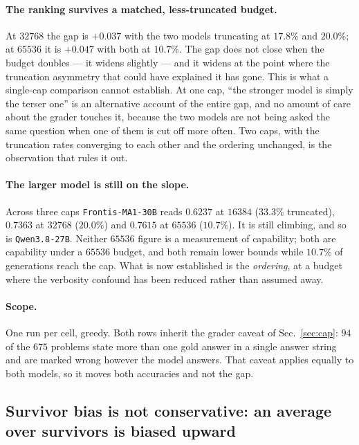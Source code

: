 \paragraph{The ranking survives a matched, less-truncated budget.} At $32768$ the gap is
$+0.037$ with the two models truncating at $17.8\%$ and $20.0\%$; at $65536$ it is $+0.047$
with both at $10.7\%$. The gap does not close when the budget doubles --- it widens slightly
--- and it widens at the point where the truncation asymmetry that could have explained it
has gone. This is what a single-cap comparison cannot establish. At one cap, ``the stronger
model is simply the terser one'' is an alternative account of the entire gap, and no amount
of care about the grader touches it, because the two models are not being asked the same
question when one of them is cut off more often. Two caps, with the truncation rates
converging to each other and the ordering unchanged, is the observation that rules it out.

\paragraph{The larger model is still on the slope.} Across three caps
\texttt{Frontis-MA1-30B} reads $0.6237$ at $16384$ ($33.3\%$ truncated), $0.7363$ at $32768$
($20.0\%$) and $0.7615$ at $65536$ ($10.7\%$). It is still climbing, and so is
\texttt{Qwen3.8-27B}. Neither $65536$ figure is a measurement of capability; both are
capability under a $65536$ budget, and both remain lower bounds while $10.7\%$ of generations
reach the cap. What is now established is the \emph{ordering}, at a budget where the
verbosity confound has been reduced rather than assumed away.

\paragraph{Scope.} One run per cell, greedy. Both rows inherit the grader caveat of
Sec.~\ref{sec:cap}: $94$ of the $675$ problems state more than one gold answer in a single
answer string and are marked wrong however the model answers. That caveat applies equally to
both models, so it moves both accuracies and not the gap.

\subsection{Survivor bias is not conservative: an average over survivors is biased upward}
\label{sec:survivor}

